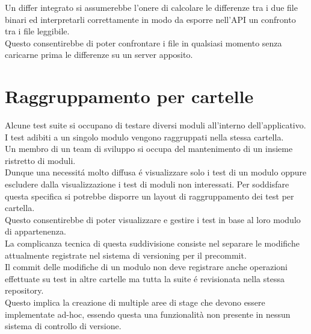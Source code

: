         Un differ integrato si assumerebbe l'onere di calcolare le differenze tra i due file binari ed interpretarli correttamente in modo da esporre nell'API un confronto tra i file leggibile.\\
        Questo consentirebbe di poter confrontare i file in qualsiasi momento senza caricarne prima le differenze su un server apposito.
    \section{Raggruppamento per cartelle}
        Alcune test suite si occupano di testare diversi moduli all'interno dell'applicativo.\\
        I test adibiti a un singolo modulo vengono raggruppati nella stessa cartella.\\
        Un membro di un team di sviluppo si occupa del mantenimento di un insieme ristretto di moduli.\\
        Dunque una necessit\'a molto diffusa \'e visualizzare solo i test di un modulo oppure escludere dalla visualizzazione i test di moduli non interessati. 
        Per soddisfare questa specifica si potrebbe disporre un layout di raggruppamento dei test per cartella.\\
        Questo consentirebbe di poter visualizzare e gestire i test in base al loro modulo di appartenenza.\\ 

        La complicanza tecnica di questa suddivisione consiste nel separare le modifiche attualmente registrate nel sistema di versioning per il precommit.\\
        Il commit delle modifiche di un modulo non deve registrare anche operazioni effettuate su test in altre cartelle ma tutta la suite \'e revisionata nella stessa repository.\\
        Questo implica la creazione di multiple aree di stage che devono essere implementate ad-hoc, essendo questa una funzionalità non presente in nessun sistema di controllo di versione.\\